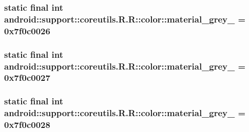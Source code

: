 \hypertarget{classandroid_1_1support_1_1coreutils_1_1_r_1_1color_38514bb935a6bed8094854d879b8f985}{
\subsubsection[{material\_\-grey\_\-50}]{\setlength{\rightskip}{0pt plus 5cm}static final int android::support::coreutils.R.R::color::material\_\-grey\_ = 0x7f0c0026}}
\label{classandroid_1_1support_1_1coreutils_1_1_r_1_1color_38514bb935a6bed8094854d879b8f985}


\hypertarget{classandroid_1_1support_1_1coreutils_1_1_r_1_1color_d8dbef2eacd2de18ad307176c4cb6fea}{
\subsubsection[{material\_\-grey\_\-600}]{\setlength{\rightskip}{0pt plus 5cm}static final int android::support::coreutils.R.R::color::material\_\-grey\_ = 0x7f0c0027}}
\label{classandroid_1_1support_1_1coreutils_1_1_r_1_1color_d8dbef2eacd2de18ad307176c4cb6fea}


\hypertarget{classandroid_1_1support_1_1coreutils_1_1_r_1_1color_abf0112d4af2859d9db024bad780c9aa}{
\subsubsection[{material\_\-grey\_\-800}]{\setlength{\rightskip}{0pt plus 5cm}static final int android::support::coreutils.R.R::color::material\_\-grey\_ = 0x7f0c0028}}
\label{classandroid_1_1support_1_1coreutils_1_1_r_1_1color_abf0112d4af2859d9db024bad780c9aa}



